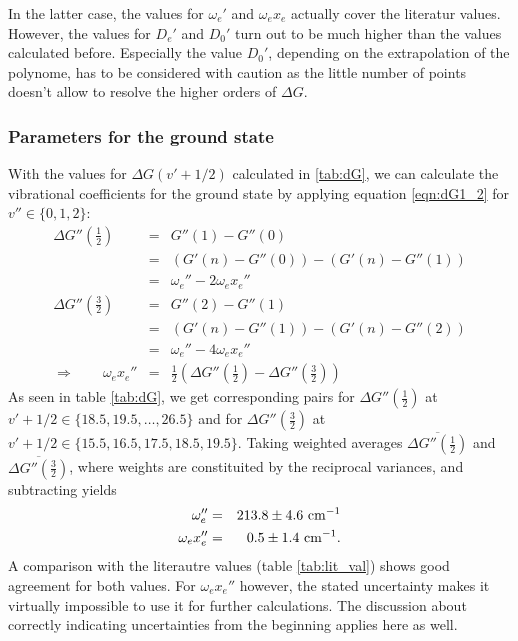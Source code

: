 In the latter case, the values for $\omega_e'$ and $\omega_e x_e$ 
actually cover the literatur values. However, the values for 
$D_e'$ and $D_0'$ turn out to be much higher than the values 
calculated before. Especially the value $D_0'$, depending on the 
extrapolation of the polynome, has to be considered with caution 
as the little number of points doesn't allow to resolve the higher 
orders of $\Delta G$. 


\subsubsection{Parameters for the ground state}
With the values for $\Delta G(v' + 1/2)$ calculated in \ref{tab:dG}, we can calculate the vibrational coefficients for 
the ground state by applying equation \eqref{eqn:dG1_2} for $v'' \in \{0, 1, 2\}$:
\begin{eqnarray}
    \Delta G''\left ( \frac{1}{2} \right ) &=& G''(1) - G''(0) \nonumber\\
        &=& (G'(n) - G''(0)) - (G'(n) - G''(1)) \nonumber \\
        &=& \omega_e'' - 2 \omega_e x_e'' \\
    \Delta G''\left ( \frac{3}{2} \right ) &=& G''(2) - G''(1) \nonumber\\
        &=& (G'(n) - G''(1)) - (G'(n) - G''(2)) \nonumber \\
        &=& \omega_e'' - 4 \omega_e x_e'' \\
  \Rightarrow \qquad  \omega_e x_e'' &=& \frac{1}{2} \left ( \Delta G''\left ( \frac{1}{2} \right ) - 
        \Delta G''\left ( \frac{3}{2} \right ) \right )
\end{eqnarray}
As seen in table \ref{tab:dG}, we get corresponding pairs for 
$\Delta G''\left ( \frac{1}{2} \right )$ at $v' + 1/2 \in \{18.5, 19.5, \ldots, 26.5\}$ 
and for 
$\Delta G''\left ( \frac{3}{2} \right )$ at $v' + 1/2 \in \{15.5, 16.5, 17.5, 18.5, 19.5\}$.
Taking weighted averages $\overline{\Delta G''\left ( \frac{1}{2} \right )}$ and 
$\overline{\Delta G''\left ( \frac{3}{2} \right )}$, 
where weights are constituited by the reciprocal variances, 
and subtracting yields
\begin{eqnarray}
    \omega_e'' &=& 213.8 \pm 4.6 \ \mathrm{cm^{-1}} \\
    \omega_e x_e'' &=& 0.5 \pm 1.4 \ \mathrm{cm^{-1}}.
\end{eqnarray}
A comparison with the literautre values (table \ref{tab:lit_val}) shows 
good agreement for both values. For $\omega_e x_e''$ however, the stated 
uncertainty makes it virtually impossible to use it for further calculations.
The discussion about correctly indicating uncertainties from the beginning 
applies here as well. 



